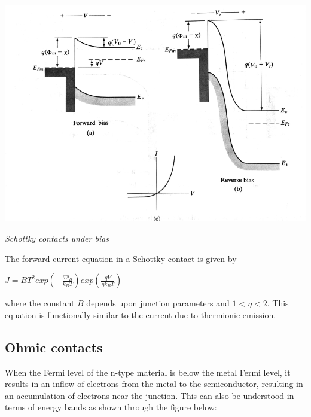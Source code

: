 \documentclass[12 pt]{article}
\begin{document}
\par
\begin{center}
    \includegraphics{Shottky_diode_bias.png}
\end{center}
\begin{center}
    \emph{\hspace{2 cm}Schottky contacts under bias\newline}
\end{center}
\par

The forward current equation in a Schottky contact is given by-
\begin{center}
    $ J = BT^{2}exp(-\frac{q\phi_{B}}{k_{B}T})exp(\frac{qV}{\eta k_{B}T})$
\end{center}
where the constant $B$ depends upon junction parameters and $1< \eta <2$. This equation is functionally similar to the current due to \href{https://en.wikipedia.org/wiki/Thermionic_emission}{thermionic emission}. 
\subsection{Ohmic contacts}

When the Fermi level of the n-type material is below the metal Fermi level, it results in an inflow of electrons from the metal to the semiconductor, resulting in an accumulation of electrons near the junction. This can also be understood in terms of energy bands as shown through the figure below: \newline
\end{document}
